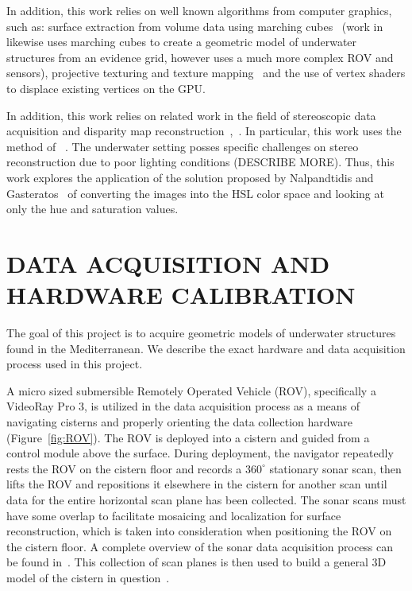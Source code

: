 \documentclass[a4paper,twoside]{article}
\begin{document}
In addition, this work relies on well known algorithms from computer graphics, such as: surface extraction from volume data using marching cubes~\cite{Lorensen} (work in ~\cite{Fairfield:2010} likewise uses marching cubes to create a geometric model of underwater structures from an evidence grid, however uses a much more complex ROV and sensors), projective texturing and texture mapping~\cite{Williams78castingcurved,Segal} and the use of vertex shaders to displace existing vertices on the GPU.

In addition, this work relies on related work in the field of stereoscopic data acquisition and disparity map reconstruction~\cite{stereo:gutMarroquin},~\cite{stereo:scharsteinSzeliski}.  In particular, this work uses the method of ~\cite{stereo:zitKan}.  The underwater setting posses specific challenges on stereo reconstruction due to poor lighting conditions (DESCRIBE MORE).  Thus, this work explores the application of the solution proposed by Nalpandtidis and Gasteratos~\cite{stereo:nalpantidis2010stereo}  of  converting the images into the HSL color space and looking at only the hue and saturation values. 


\section{\uppercase{Data Acquisition and Hardware Calibration}}
\label{sec:data}

\noindent The goal of this project is to acquire geometric models of underwater structures found in the Mediterranean.  We describe the exact hardware and data acquisition process used in this project.

A micro sized submersible Remotely Operated Vehicle (ROV), specifically a VideoRay Pro 3, is utilized in the data acquisition process as a means of navigating cisterns and properly orienting the data collection hardware (Figure~\ref{fig:ROV}). The ROV is deployed into a cistern and guided from a control module above the surface. During deployment, the navigator repeatedly rests the ROV on the cistern floor and records a $360^{\circ}$ stationary sonar scan, then lifts the ROV and repositions it elsewhere in the cistern for another scan until data for the entire horizontal scan plane has been collected. The sonar scans must have some overlap to facilitate mosaicing and localization for surface reconstruction, which is taken into consideration when positioning the ROV on the cistern floor. A complete overview of the sonar data acquisition process can be found in~\cite{ClarkVast}.  This collection of scan planes is then used to build a general 3D model of the cistern in question~\cite{ICEX11}.
  
\end{document}
